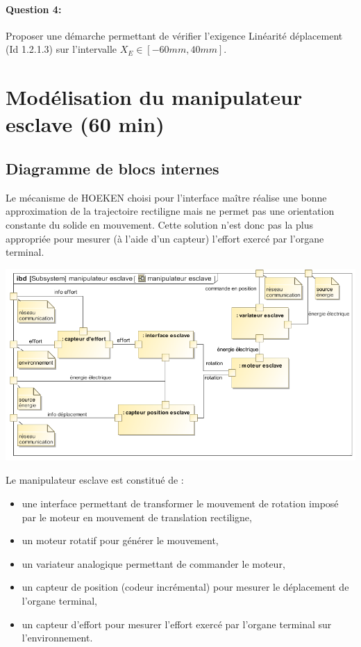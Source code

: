 \paragraph{Question 4:} Proposer une démarche permettant de vérifier l'exigence \og Linéarité déplacement \fg (Id 1.2.1.3) sur l'intervalle $X_E\in[-60mm,40mm]$.

\section{Modélisation du manipulateur esclave (60 min)}

\subsection{Diagramme de blocs internes}

Le mécanisme de HOEKEN choisi pour l'interface maître réalise une bonne approximation de la trajectoire rectiligne mais ne permet pas une orientation constante du solide en mouvement. Cette solution n'est donc pas la plus appropriée pour mesurer (à l'aide d'un capteur) l'effort exercé par l'organe terminal.

\begin{center}
 \includegraphics[width=0.9\linewidth]{img/Figure9}
\end{center}

Le manipulateur esclave est constitué de :
\begin{itemize}
 \item une interface permettant de transformer le mouvement de rotation imposé par le moteur
en mouvement de translation rectiligne,
 \item un moteur rotatif pour générer le mouvement,
 \item un variateur analogique permettant de commander le moteur,
 \item un capteur de position (codeur incrémental) pour mesurer le déplacement de l'organe terminal,
 \item un capteur d'effort pour mesurer l'effort exercé par l'organe terminal sur  l'environnement.
\end{itemize}

